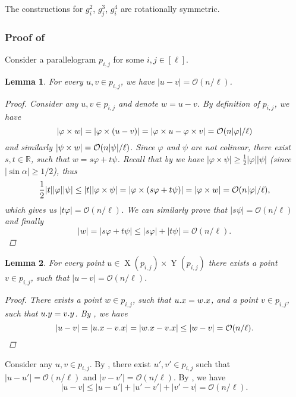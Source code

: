\documentclass[11pt]{article}
\renewcommand{\O}{\mathcal{O}}
\renewcommand{\phi}{\varphi}
\theoremstyle{plain}
\newtheorem{lemma}{Lemma}
\theoremstyle{definition}
\theoremstyle{remark}
\DeclareMathOperator*{\X}{X}
\DeclareMathOperator*{\Y}{Y}
\begin{document}
The constructions for $g^2_i$, $g^3_j$, $g^4_i$ are rotationally symmetric.


\subsubsection{Proof of } \label{distance_bound_lemma_proof}

Consider a parallelogram $p_{i, j}$ for some $i, j \in [\ell]$.

\begin{lemma}\label{distance_bound_aux}
	For every $u, v \in p_{i, j}$, we have $|u - v| = \O(n / \ell)$.
	\begin{proof}
		Consider any $u, v \in p_{i, j}$ and denote $w = u - v$.
		By definition of $p_{i, j}$, we have
		$$ |\h{w}| = |\h{(u - v)}| = |\h{u} - \h{v}| = \O(n|\phi| / \ell) $$
		and similarly $|\s{w}| = \O(n|\psi| / \ell)$.
		Since $\phi$ and $\psi$ are not colinear, there exist $s, t \in \mathbb{R}$, such that $w = s\phi + t\psi$.
		Recall that by  we have $|\phi \times \psi| \ge \frac{1}{2}|\phi||\psi|$ (since $|\sin \alpha| \ge 1/2$), thus
		$$ \frac{1}{2}|t||\phi||\psi| \le |t||\phi \times \psi| = |\phi \times (s\phi + t\psi)| = |\h{w}| = \O(n|\phi| / \ell), $$
		which gives us $|t\phi| = \O(n / \ell)$.
		We can similarly prove that $|s\psi| = \O(n / \ell)$ and finally
		$$ |w| = |s\phi + t\psi| \le |s\phi| + |t\psi| = \O(n / \ell). $$
	\end{proof}
\end{lemma}

\begin{lemma}\label{distance_bound_aux2}
	For every point $u \in \X(p_{i, j}) \times \Y(p_{i, j})$ there exists a point $v \in p_{i, j}$, such that $|u - v| = \O(n / \ell)$.
	\begin{proof}
		There exists a point $w \in p_{i, j}$, such that $u.x = w.x$, and a point $v \in p_{i, j}$, such that $u.y = v.y$.
		By , we have
		$$|u - v| = |\x{u} - \x{v}| = |\x{w} - \x{v}| \le |w - v| = \O(n / \ell).$$ 
	\end{proof}
\end{lemma}

Consider any $u, v \in p_{i, j}$.
By , there exist $u', v' \in p_{i, j}$ such that $|u - u'| = \O(n / \ell)$ and $|v - v'| = \O(n / \ell)$.
By , we have
$$ |u - v| \le |u - u'| + |u' - v'| + |v' - v| = \O(n / \ell). $$



\end{document}
